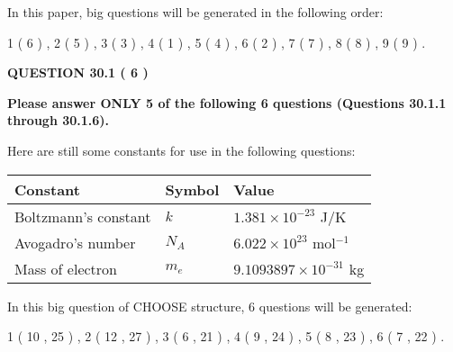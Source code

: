 \documentclass[12pt]{article}
\begin{document}
\vspace{0.3in}
 
 
   
   
   
\vspace{0.2in}
   
In this paper, big questions will be generated in the following order: 
   
   
             1 (           6 )
 ,
             2 (           5 )
 ,
             3 (           3 )
 ,
             4 (           1 )
 ,
             5 (           4 )
 ,
             6 (           2 )
 ,
             7 (           7 )
 ,
             8 (           8 )
 ,
             9 (           9 )
 .
  
\vspace{0.2in}
  
{\textbf{\Large{QUESTION
30.1 
 (           6 )
}}}
  
  
 
{\textbf{\Large{Please answer ONLY
5 of the following
6 questions (Questions
30.1.1 through
30.1.6). }}}
 
Here are still some constants for use in the following questions:
 
 
\noindent\begin{tabular}{|l|l|l|}
\hline
Constant & Symbol & Value \\
\hline
 
Boltzmann's constant &
$k$ &
 $ 1.381 \times 10^{-23} $
J/K \\
\hline
 
Avogadro's number &
$N_A$ &
 $ 6.022 \times 10^{23} $
mol$^{-1}$ \\
\hline
 
Mass of electron &
$m_e$ &
 $ 9.1093897 \times 10^{-31} $
kg \\
\hline
 
\end{tabular}
 
   
\vspace{0.2in}
   
 In this big question of CHOOSE structure,            6  questions will be generated: 
  
  
             1 (          10 ,          25 )
 ,
             2 (          12 ,          27 )
 ,
             3 (           6 ,          21 )
 ,
             4 (           9 ,          24 )
 ,
             5 (           8 ,          23 )
 ,
             6 (           7 ,          22 )
 .
  
\vspace{0.2in}
  
\end{document}
